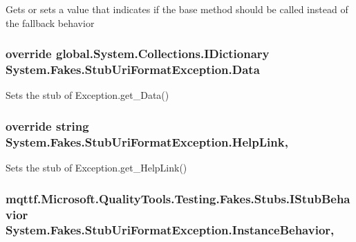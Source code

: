 Gets or sets a value that indicates if the base method should be called instead of the fallback behavior

\hypertarget{class_system_1_1_fakes_1_1_stub_uri_format_exception_a95535c25938a4412dd50623e0b104203}{
\subsubsection[{Data}]{\setlength{\rightskip}{0pt plus 5cm}override global.\-System.\-Collections.\-I\-Dictionary System.\-Fakes.\-Stub\-Uri\-Format\-Exception.\-Data\hspace{0.3cm}{\ttfamily [get]}}}\label{class_system_1_1_fakes_1_1_stub_uri_format_exception_a95535c25938a4412dd50623e0b104203}


Sets the stub of Exception.\-get\-\_\-\-Data()

\hypertarget{class_system_1_1_fakes_1_1_stub_uri_format_exception_ae7dc5ce05c98088406f79cb9a04e86e8}{
\subsubsection[{Help\-Link}]{\setlength{\rightskip}{0pt plus 5cm}override string System.\-Fakes.\-Stub\-Uri\-Format\-Exception.\-Help\-Link\hspace{0.3cm}{\ttfamily [get]}, {\ttfamily [set]}}}\label{class_system_1_1_fakes_1_1_stub_uri_format_exception_ae7dc5ce05c98088406f79cb9a04e86e8}


Sets the stub of Exception.\-get\-\_\-\-Help\-Link()

\hypertarget{class_system_1_1_fakes_1_1_stub_uri_format_exception_ae43757b2188ff000992be1050c50fd6d}{
\subsubsection[{Instance\-Behavior}]{\setlength{\rightskip}{0pt plus 5cm}mqttf.\-Microsoft.\-Quality\-Tools.\-Testing.\-Fakes.\-Stubs.\-I\-Stub\-Behavior System.\-Fakes.\-Stub\-Uri\-Format\-Exception.\-Instance\-Behavior\hspace{0.3cm}{\ttfamily [get]}, {\ttfamily [set]}}}\label{class_system_1_1_fakes_1_1_stub_uri_format_exception_ae43757b2188ff000992be1050c50fd6d}


